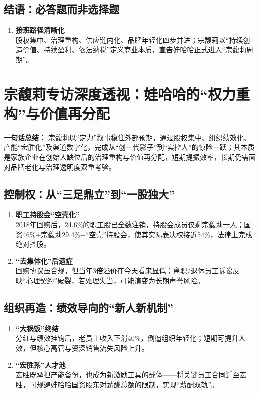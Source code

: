 \subsection{结语：必答题而非选择题}
\begin{enumerate}[leftmargin=*, nosep]
    \item \textbf{接班路径清晰化}  \\
    股权集中、治理重构、供应链内化、品牌年轻化四步并进；宗馥莉以“持续创造价值、持续盈利、依法纳税”定义商业本质，宣告娃哈哈正式进入{\color{red}“宗馥莉周期”}。
\end{enumerate}


\section{宗馥莉专访深度透视：娃哈哈的“权力重构”与价值再分配}
\textbf{一句话总结：}  
宗馥莉以“定力”叙事稳住外部预期，通过股权集中、组织绩效化、产能“宏胜化”及渠道数字化，完成{\color{red}从“创一代影子”到“实控人”}的惊险一跃；其本质是家族企业在创始人缺位后的治理重构与价值再分配，短期提振效率，长期仍需面对品牌老化与治理透明度双重考验。

\subsection{控制权：从“三足鼎立”到“一股独大”}
\begin{enumerate}[leftmargin=*, nosep]
    \item \textbf{职工持股会“空壳化”}  \\
    2018年回购后，24.6\%的职工股已全数注销，持股会成员仅剩宗馥莉一人；国资46\%+宗馥莉29.4\%+“空壳”持股会，使其实际表决权接近54\%，法律上完成绝对控股。
    \item \textbf{“去集体化”后遗症}  \\
    回购协议虽合规，但当年3倍溢价在今天看来显低；离职/退休员工诉讼反映“心理契约”破裂，若处理失当，可能演变为长期声誉风险。
\end{enumerate}

\subsection{组织再造：绩效导向的“新人新机制”}
\begin{enumerate}[leftmargin=*, nosep]
    \item \textbf{“大锅饭”终结}  \\
    分红与绩效挂钩后，老员工收入下滑40\%，倒逼组织年轻化；短期可提升人效，但核心高管与资深销售流失风险上升。
    \item \textbf{“宏胜系”人才池}  \\
    宏胜既承担产能备份，也成为新激励工具的载体——将关键员工合同迁至宏胜，可规避娃哈哈国资股东对薪酬总额的限制，实现“薪酬双轨”。
\end{enumerate}

